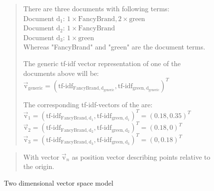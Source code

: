 \begin{figure}[h]

    \begin{quote}
        There are three documents with following terms:\\
        Document $\text{d}_1$: $1\times \text{FancyBrand}, 2\times \text{green}$\\
        Document $\text{d}_2$: $1\times \text{FancyBrand}$\\
        Document $\text{d}_3$: $1\times \text{green}$\\
        Whereas "FancyBrand" and "green" are the document terms.

        \noindent
        The generic tf-idf vector representation of one of the documents above will be:\\
        $\vec{\text{v}}_{\text{generic}} = (\text{tf-idf}_{\text{FancyBrand},\text{d}_\text{generic}}, \text{tf-idf}_{\text{green},\text{d}_\text{generic}})^T$

        \noindent
        The corresponding tf-idf-vectors of the are:\\
        $\vec{\text{v}}_1 = (\text{tf-idf}_{\text{FancyBrand},\text{d}_1}, \text{tf-idf}_{\text{green},\text{d}_1})^T = (0.18, 0.35)^T$\\
        $\vec{\text{v}}_2 = (\text{tf-idf}_{\text{FancyBrand},\text{d}_2}, \text{tf-idf}_{\text{green},\text{d}_2})^T = (0.18, 0)^T$\\
        $\vec{\text{v}}_3 = (\text{tf-idf}_{\text{FancyBrand},\text{d}_3}, \text{tf-idf}_{\text{green},\text{d}_3})^T = (0, 0.18)^T$\\
    \end{quote}

    \begin{quote}
        With vector $\vec{\text{v}}_n$ as position vector describing points relative to the origin.
    \end{quote}
    \center

    \caption{Two dimensional vector space model}
    \label{fig:vectorspacemodel}
\end{figure}


